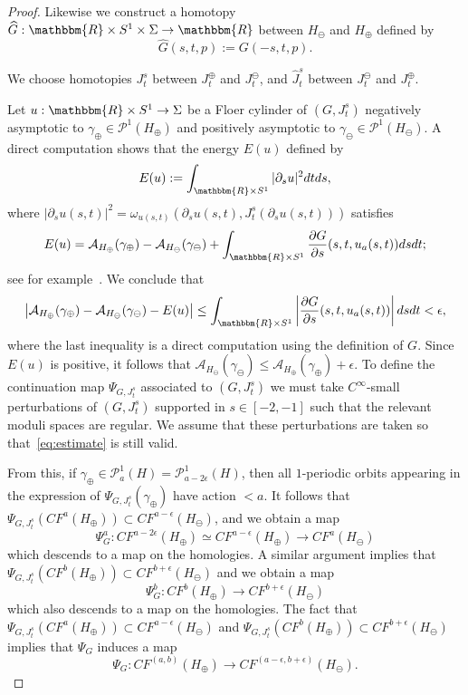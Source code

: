 \documentclass[AHL,Unicode,longabstracts,published]{cedram}
\newcommand{\R}{\mathbbm{R}}
\newcommand{\clP}{\mathcal{P}}
\newcommand{\clA}{\mathcal{A}}
\begin{document}
\begin{proof}
Likewise we construct a homotopy $\widehat G : \R \times S^1 \times \Sigma \to \R$ between $H_\ominus$ and $H_\oplus$ defined by
\begin{equation}\label{eq:G-hat}
\widehat G (s,t,p) := G(-s,t,p).
\end{equation}

We choose homotopies $J^s_t$ between $J^\oplus_t$ and $J^\ominus_t$, and $\widehat{J}^s_t$ between $J^\ominus_t$ and $J^\oplus_t$.

Let $u: \R \times S^1 \to \Sigma$ be a Floer cylinder of $(G,J^s_t)$ negatively asymptotic to $\gamma_\oplus \in \clP^1(H_\oplus)$ and positively asymptotic to $\gamma_\ominus \in \clP^1(H_\ominus)$. A direct computation shows that the energy $E(u)$ defined by
\begin{equation}\label{eq:energy}
E(u) := \int_{\R \times S^1} |\partial_s u|^2 dt ds,
\end{equation}
where $|\partial_s u(s,t)|^2 = \omega_{u(s,t)}(\partial_s u(s,t),J^{s}_{t}(\partial_s u(s,t)))$ satisfies
\begin{equation}\label{eq:energy'}
E(u)= \clA_{H_\oplus}(\gamma_\oplus) - \clA_{H_\ominus}(\gamma_\ominus) + \int_{\R \times S^1} \frac{\partial G}{\partial s}(s,t,u_a(s,t)) ds dt;
\end{equation}
see for example~\cite[Section~2]{Usher}. We conclude that
\begin{equation}\label{eq:estimate}
\left| \clA_{H_\oplus}(\gamma_\oplus) - \clA_{H_\ominus}(\gamma_\ominus) - E(u) \right| \leq \int_{\R \times S^1} \left| \frac{\partial G}{\partial s}(s,t,u_a(s,t)) \right| ds dt < \epsilon,
\end{equation}
where the last inequality is a direct computation using the definition of $G$. Since $E(u)$ is positive, it follows that $\clA_{H_\ominus}(\gamma_\ominus) \leq \clA_{H_\oplus}(\gamma_\oplus) +\epsilon $. To define the continuation map $\Psi_{G,J^s_t}$ associated to $(G,J^s_t)$ we must take $C^\infty$-small perturbations of $(G,J^s_t)$ supported in $s \in [-2,-1]$ such that the relevant moduli spaces are regular. We assume that these perturbations are taken so that~\eqref{eq:estimate} is still valid.

From this, if $\gamma_\oplus \in \clP^1_{a}(H)= \clP^1_{a- 2\epsilon}(H)$, then all $1$-periodic orbits appearing in the expression of $\Psi_{G,J^s_t}(\gamma_\oplus)$ have action $< a$. It follows that $\Psi_{G,J^s_t}(CF^a(H_\oplus)) \subset CF^{a-\epsilon}(H_\ominus) $, and we
obtain a map
\[
\Psi_G^a: CF^{a - 2\epsilon}(H_\oplus) \simeq CF^{a-\epsilon
}(H_\oplus) \to CF^{a}(H_\ominus)
\]
which descends to a map on the
homologies. A similar argument implies that 
$\Psi_{G,J^s_t}(CF^b(H_\oplus)) \subset CF^{b+\epsilon}(H_\ominus)$ and we
obtain a map
\[
\Psi_{G}^b: CF^{b}(H_\oplus) \to CF^{b+\epsilon}(H_\ominus)
\]
which also descends to a map on the homologies. The fact that
$\Psi_{G,J^s_t}(CF^a(H_\oplus)) \subset CF^{a-\epsilon}(H_\ominus) $ and $\Psi_{G,J^s_t}(CF^b(H_\oplus)) \subset CF^{b+\epsilon}(H_\ominus)$ implies
that $\Psi_{G}$ induces a map
\[
\Psi_G: CF^{(a,b)}(H_\oplus) \to
CF^{(a-\epsilon, b+\epsilon)}(H_\ominus).
\]


\end{proof}
\end{document}
